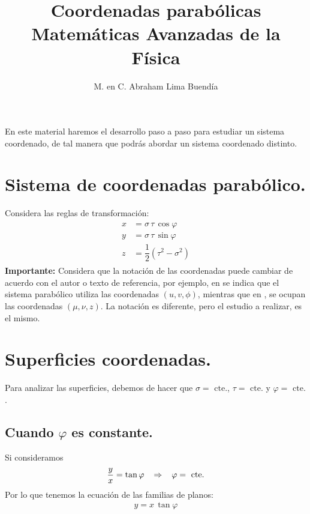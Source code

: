 
\title{Coordenadas parabólicas\\ \large{Matemáticas Avanzadas de la Física}\vspace{-3ex}}
\author{M. en C. Abraham Lima Buendía}
\date{ }

\vspace{-4cm}
\maketitle
\fontsize{14}{14}\selectfont
En este material haremos el desarrollo paso a paso para estudiar un sistema coordenado, de tal manera que podrás abordar un sistema coordenado distinto.
\section{Sistema de coordenadas parabólico.}
Considera las reglas de transformación:
\begin{align}
\begin{aligned}
x &= \sigma \, \tau \, \cos \varphi \\[0.5em]
y &= \sigma \, \tau \, \sin \varphi \\[0.5em]
z &= \dfrac{1}{2} (\tau^2 - \sigma^{2})
\end{aligned}
\label{eq:ecuacion_01}
\end{align}
\textbf{Importante: } Considera que la notación de las coordenadas puede cambiar de acuerdo con el autor o texto de referencia, por ejemplo, en \cite{Boas} se indica que el sistema parabólico utiliza las coordenadas $(u, v, \phi)$, mientras que en \cite{Moon}, se ocupan las coordenadas $(\mu, \nu, z)$. La notación es diferente, pero el estudio a realizar, es el mismo.
\section{Superficies coordenadas.}
Para analizar las superficies, debemos de hacer que $\sigma = \mbox{ cte.}$, $\tau = \mbox{ cte.}$ y $\varphi = \mbox{ cte.}$.
\subsection{Cuando $\varphi$ es constante.}
Si consideramos
\begin{align*}
\dfrac{y}{x} = \tan \varphi \hspace{0.3cm} \Rightarrow \hspace{0.3cm} \varphi = \mbox{ cte.}
\end{align*}
Por lo que tenemos la ecuación de las familias de planos:
\begin{align*}
y = x \, \tan \varphi
\end{align*}
